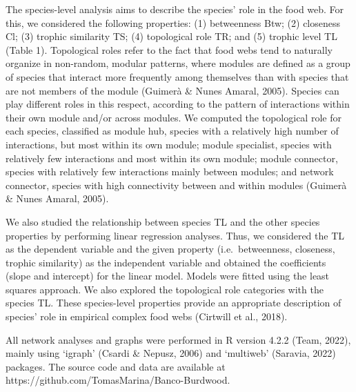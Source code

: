 \documentclass[preprint, 3p,
authoryear]{elsarticle} %
\begin{document}
The species-level analysis aims to describe the species' role in the
food web. For this, we considered the following properties: (1)
betweenness Btw; (2) closeness Cl; (3) trophic similarity TS; (4)
topological role TR; and (5) trophic level TL (Table 1). Topological
roles refer to the fact that food webs tend to naturally organize in
non-random, modular patterns, where modules are defined as a group of
species that interact more frequently among themselves than with species
that are not members of the module (Guimerà \& Nunes Amaral, 2005).
Species can play different roles in this respect, according to the
pattern of interactions within their own module and/or across modules.
We computed the topological role for each species, classified as module
hub, species with a relatively high number of interactions, but most
within its own module; module specialist, species with relatively few
interactions and most within its own module; module connector, species
with relatively few interactions mainly between modules; and network
connector, species with high connectivity between and within modules
(Guimerà \& Nunes Amaral, 2005).

We also studied the relationship between species TL and the other
species properties by performing linear regression analyses. Thus, we
considered the TL as the dependent variable and the given property
(i.e.~betweenness, closeness, trophic similarity) as the independent
variable and obtained the coefficients (slope and intercept) for the
linear model. Models were fitted using the least squares approach. We
also explored the topological role categories with the species TL. These
species-level properties provide an appropriate description of species'
role in empirical complex food webs (Cirtwill et al., 2018).

All network analyses and graphs were performed in R version 4.2.2 (Team,
2022), mainly using `igraph' (Csardi \& Nepusz, 2006) and `multiweb'
(Saravia, 2022) packages. The source code and data are available at
https://github.com/TomasMarina/Banco-Burdwood.
\end{document}
